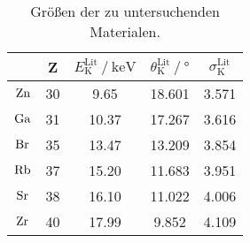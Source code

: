     \begin{table}
        \centering
        \caption{Größen der zu untersuchenden Materialen.}
        \label{tab:Vorbereitung2}
        \begin{tabular}{c c S S S}
            \toprule
            &
            Z &
            {$E_\text{K}^\text{Lit} \mathbin{/} \si{\kilo\electronvolt}$} &
            {$\theta_\text{K}^\text{Lit} \mathbin{/} \si{\degree}$} &
            {$\sigma_\text{K}^\text{Lit}$} \\
            \midrule
            $\ce{Zn}$ & 30 &  9.65 & 18.601 & 3.571 \\
            $\ce{Ga}$ & 31 & 10.37 & 17.267 & 3.616 \\
            $\ce{Br}$ & 35 & 13.47 & 13.209 & 3.854 \\
            $\ce{Rb}$ & 37 & 15.20 & 11.683 & 3.951 \\
            $\ce{Sr}$ & 38 & 16.10 & 11.022 & 4.006 \\
            $\ce{Zr}$ & 40 & 17.99 &  9.852 & 4.109 \\
            \bottomrule
        \end{tabular}
    \end{table}
